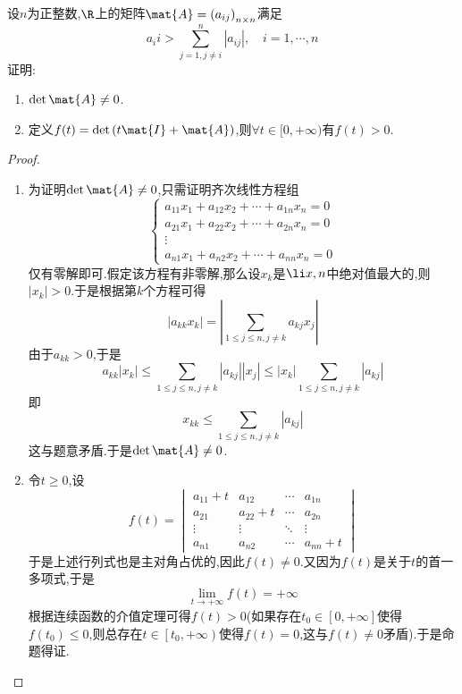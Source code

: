 \documentclass{ctexart}
\begin{document}
\begin{homework}[6(10')]
    设$n$为正整数,$\R$上的矩阵$\mat{A}=\left(a_{ij}\right)_{n\times n}$满足
    \[a_ii>\sum_{j=1,j\neq i}^{n}\left|a_{ij}\right|,\quad i=1,\cdots,n\]
    证明:
    \begin{enumerate}
        \item $\det\mat{A}\neq0$.
        \item 定义$f(t)=\det\left(t\mat{I}+\mat{A}\right)$,则$\forall t\in[0,+\infty)$有$f(t)>0$.
    \end{enumerate}
\end{homework}
\begin{proof}
\begin{enumerate}
    \item 为证明$\det\mat{A}\neq0$,只需证明齐次线性方程组
    \[\left\{\begin{array}{c}
        a_{11}x_1+a_{12}x_2+\cdots+a_{1n}x_n=0\\
        a_{21}x_1+a_{22}x_2+\cdots+a_{2n}x_n=0\\
        \vdots\\
        a_{n1}x_1+a_{n2}x_2+\cdots+a_{nn}x_n=0
    \end{array}\right.\]
    仅有零解即可.假定该方程有非零解,那么设$x_k$是$\li x,n$中绝对值最大的,则$\left|x_k\right|>0$.于是根据第$k$个方程可得
    \[\left|a_{kk}x_k\right|=\left|\sum_{1\leqslant j\leqslant n,j\neq k}a_{kj}x_j\right|\]
    由于$a_{kk}>0$,于是
    \[a_{kk}\left|x_k\right|\leqslant\sum_{1\leqslant j\leqslant n,j\neq k}\left|a_{kj}\right|\left|x_j\right|\leqslant\left|x_k\right|\sum_{1\leqslant j\leqslant n,j\neq k}\left|a_{kj}\right|\]
    即
    \[x_{kk}\leqslant\sum_{1\leqslant j\leqslant n,j\neq k}\left|a_{kj}\right|\]
    这与题意矛盾.于是$\det\mat{A}\neq0$.
    \item 令$t\geqslant0$,设
    \[f(t)=\begin{vmatrix}
        a_{11}+t&a_{12}&\cdots&a_{1n}\\
        a_{21}&a_{22}+t&\cdots&a_{2n}\\
        \vdots&\vdots&\ddots&\vdots\\
        a_{n1}&a_{n2}&\cdots&a_{nn}+t
    \end{vmatrix}\]
    于是上述行列式也是主对角占优的,因此$f(t)\neq0$.又因为$f(t)$是关于$t$的首一多项式,于是
    \[\lim_{t\to+\infty}f(t)=+\infty\]
    根据连续函数的介值定理可得$f(t)>0$(如果存在$t_0\in[0,+\infty]$使得$f\left(t_0\right)\leq0$,则总存在$t\in\left[t_0,+\infty\right)$使得$f(t)=0$,这与$f(t)\neq0$矛盾).于是命题得证.
\end{enumerate}
\end{proof}
\end{document}
